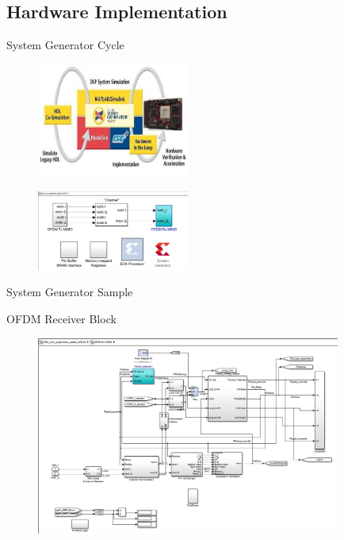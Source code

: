 \documentclass{beamer}
\begin{document}
\subsection{Hardware Implementation}

\begin{frame}{System Generator Cycle}
\begin{figure}[h!]
\centering
\includegraphics[width=5cm]{content/fig/systemGen.JPG}
\end{figure}
\begin{figure}[h!]
\centering
\includegraphics[width=5cm]{content/fig/system.JPG}
\end{figure}
\end{frame}


\begin{frame}{System Generator Sample}

OFDM Receiver Block
\begin{figure}
\centering
\includegraphics[width=10cm]{content/fig/rxblock.JPG}
\end{figure}
\end{frame}
\end{document}
